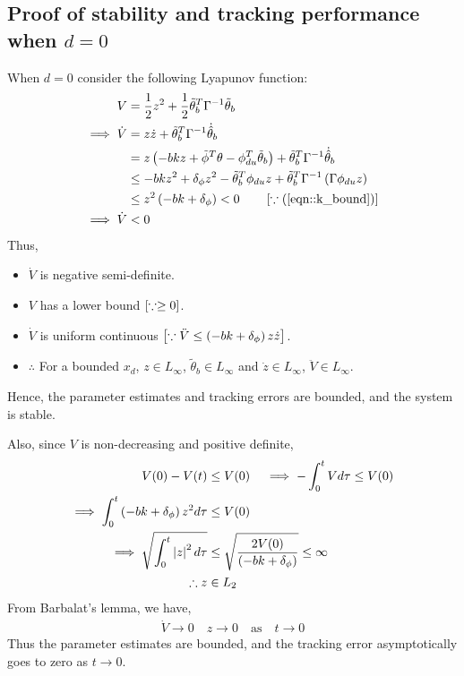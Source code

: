 \subsection{Proof of stability and tracking performance when $d = 0$}

When $d = 0$ consider the following Lyapunov function:
\begin{align*}
    V &= \frac{1}{2} z^2 + \frac{1}{2} \tilde{\theta}_b^T \Gamma^{-1} \tilde{\theta}_b\\
    \implies \dot V &= z \dot z + \tilde \theta_b^T \Gamma^{-1} \dot{\hat \theta}_b\\
    &= z \left( - bk z +  \tilde \phi^T \theta - \phi_{du}^T \tilde \theta_b \right)+ \tilde \theta_b^T \Gamma^{-1} \dot{\hat \theta}_b\\
    &\leq -bkz^2 + \delta_\phi z^2 - \tilde \theta_b^T \phi_{du} z + \tilde \theta_b^T \Gamma^{-1} \left( \Gamma \phi_{du} z \right)\\
    &\leq z^2 \left( -bk + \delta_\phi \right) < 0 \qquad \left[ \because (\ref{eqn::k_bound}) \right]\\
    \implies \dot V &< 0
\end{align*}
Thus,
\begin{itemize}
    \item $\dot V$ is negative semi-definite.
    \item $V$ has a lower bound $ \left[ \because \geq 0 \right]$.
\item $\dot V$ is uniform continuous $\left[ \because \ddot V \leq \left( -bk +
\delta_\phi \right)z \dot z  \right]$.
    \item $\therefore$ For a bounded $x_d$, $z \in L_\infty$, $\tilde{
    \theta}_b \in L_{\infty}$ and $\dot z \in L_\infty$, $\ddot V \in L_\infty$.
\end{itemize}

Hence, the parameter estimates and tracking errors are bounded, and the system
is stable.

Also, since $V$ is non-decreasing and positive definite,
\begin{align*}
    V(0) - V(t) &\leq V(0) \quad
    \implies -\int_0^t V d \tau \leq V(0)\\
    \implies \int_0^t \left( -bk + \delta_\phi \right) z^2 d \tau &\leq V(0)\\
    \implies \sqrt{\int_0^t \left\lvert z \right\rvert^2 d \tau } &\leq \sqrt{\frac{2 V(0)}{\left( -bk + \delta_\phi \right)}} \leq \infty\\
    \therefore z &\in L_2
\end{align*}
From Barbalat's lemma, we have,
\begin{align*}
    \dot V \rightarrow 0 \quad z \rightarrow 0 \quad \text{as} \quad t \rightarrow 0
\end{align*}
Thus the parameter estimates are bounded, and the tracking error asymptotically
goes to zero as  $t \rightarrow 0$.
